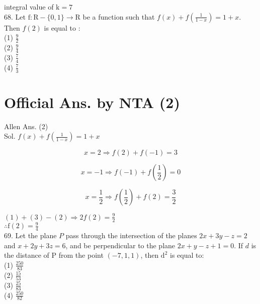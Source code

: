 \documentclass[10pt]{article}
\begin{document}
integral value of \(\mathrm{k}=7\)\\
68. Let \(\mathrm{f}: \mathrm{R}-\{0,1\} \rightarrow \mathrm{R}\) be a function such that \(f(x)+f\left(\frac{1}{1-x}\right)=1+x\). Then \(f(2)\) is equal to \(:\)\\
(1) \(\frac{9}{2}\)\\
(2) \(\frac{9}{4}\)\\
(3) \(\frac{7}{4}\)\\
(4) \(\frac{7}{3}\)

\section*{Official Ans. by NTA (2)}
Allen Ans. (2)\\
Sol. \(f(x)+f\left(\frac{1}{1-x}\right)=1+x\)

\[
x=2 \Rightarrow f(2)+f(-1)=3
\]

\[
x=-1 \Rightarrow f(-1)+f\left(\frac{1}{2}\right)=0
\]

\[
x=\frac{1}{2} \Rightarrow f\left(\frac{1}{2}\right)+f(2)=\frac{3}{2}
\]

\((1)+(3)-(2) \Rightarrow 2 f(2)=\frac{9}{2}\)\\
\(\therefore \mathrm{f}(2)=\frac{9}{4}\)\\
69. Let the plane \(P\) pass through the intersection of the planes \(2 x+3 y-z=2\) and \(x+2 y+3 z=6\), and be perpendicular to the plane \(2 x+y-z+1=0\). If \(d\) is the distance of P from the point \((-7,1,1)\), then \(\mathrm{d}^{2}\) is equal to:\\
(1) \(\frac{250}{83}\)\\
(2) \(\frac{15}{53}\)\\
(3) \(\frac{25}{83}\)\\
(4) \(\frac{250}{82}\)
\end{document}
